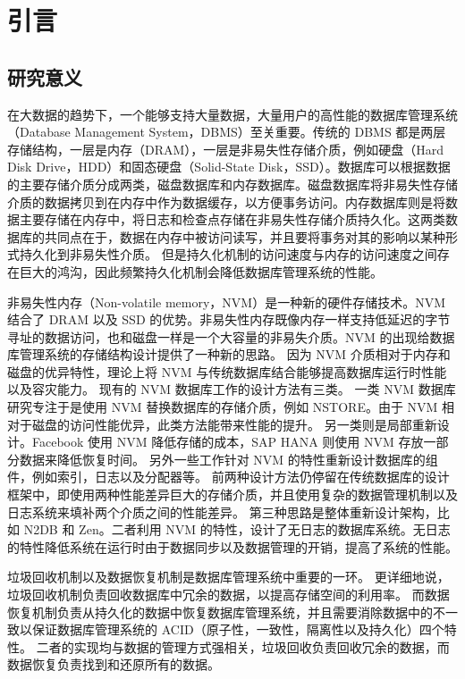 
\chapter{引言}

\section{研究意义}

在大数据的趋势下，一个能够支持大量数据，大量用户的高性能的数据库管理系统（Database Management System，DBMS）至关重要。传统的 DBMS 都是两层存储结构，一层是内存（DRAM），一层是非易失性存储介质，例如硬盘（Hard Disk Drive，HDD）和固态硬盘（Solid-State Disk，SSD）。数据库可以根据数据的主要存储介质分成两类，磁盘数据库和内存数据库。磁盘数据库将非易失性存储介质的数据拷贝到在内存中作为数据缓存，以方便事务访问。内存数据库则是将数据主要存储在内存中，将日志和检查点存储在非易失性存储介质持久化。这两类数据库的共同点在于，数据在内存中被访问读写，并且要将事务对其的影响以某种形式持久化到非易失性介质。
但是持久化机制的访问速度与内存的访问速度之间存在巨大的鸿沟，因此频繁持久化机制会降低数据库管理系统的性能。

非易失性内存（Non-volatile memory，NVM）是一种新的硬件存储技术。NVM 结合了 DRAM 以及 SSD 的优势。非易失性内存既像内存一样支持低延迟的字节寻址的数据访问，也和磁盘一样是一个大容量的非易失介质。NVM 的出现给数据库管理系统的存储结构设计提供了一种新的思路。
因为 NVM 介质相对于内存和磁盘的优异特性，理论上将 NVM 与传统数据库结合能够提高数据库运行时性能以及容灾能力。
现有的 NVM 数据库工作的设计方法有三类。
一类 NVM 数据库研究专注于是使用 NVM 替换数据库的存储介质，例如 NSTORE\cite{arulraj_lets_2015}。由于 NVM 相对于磁盘的访问性能优异，此类方法能带来性能的提升。
另一类则是局部重新设计。Facebook 使用 NVM 降低存储的成本\cite{facebook}，SAP HANA 则使用 NVM 存放一部分数据来降低恢复时间\cite{andrei_sap_2017}。
另外一些工作针对 NVM 的特性重新设计数据库的组件，例如索引\cite{nv-tree,chen_persistent_2015,ma_roart_2021}，日志\cite{wbl}以及分配器\cite{pmdk,bhandari_makalu_2016}等。
前两种设计方法仍停留在传统数据库的设计框架中，即使用两种性能差异巨大的存储介质，并且使用复杂的数据管理机制以及日志系统来填补两个介质之间的性能差异。
第三种思路是整体重新设计架构，比如 N2DB\cite{liu_graduate} 和 Zen\cite{liu_zen_2021}。二者利用 NVM 的特性，设计了无日志的数据库系统。无日志的特性降低系统在运行时由于数据同步以及数据管理的开销，提高了系统的性能。


垃圾回收机制以及数据恢复机制是数据库管理系统中重要的一环。
更详细地说，垃圾回收机制负责回收数据库中冗余的数据，以提高存储空间的利用率。
而数据恢复机制负责从持久化的数据中恢复数据库管理系统，并且需要消除数据中的不一致以保证数据库管理系统的 ACID（原子性，一致性，隔离性以及持久化）四个特性。
二者的实现均与数据的管理方式强相关，垃圾回收负责回收冗余的数据，而数据恢复负责找到和还原所有的数据。

